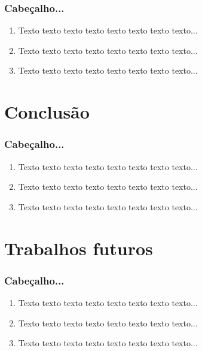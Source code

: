 \documentclass[table, usenames, svgnames, dvipsnames]{beamer}
\begin{document}
\begin{frame}
\frametitle{Cabeçalho...}
	\begin{enumerate}
    	\item Texto texto texto texto texto texto texto texto...
		\\[0.5em]

    	\item Texto texto texto texto texto texto texto texto...
		\\[0.5em]
    	
		\item Texto texto texto texto texto texto texto texto...
		\\[0.5em]
	\end{enumerate}
\end{frame}


\section{Conclusão}

\begin{frame}
\frametitle{Cabeçalho...}
	\begin{enumerate}
    	\item Texto texto texto texto texto texto texto texto...
		\\[0.5em]

    	\item Texto texto texto texto texto texto texto texto...
		\\[0.5em]
    	
		\item Texto texto texto texto texto texto texto texto...
		\\[0.5em]
	\end{enumerate}
\end{frame}

\section{Trabalhos futuros}

\begin{frame}
\frametitle{Cabeçalho...}
	\begin{enumerate}
    	\item Texto texto texto texto texto texto texto texto...
		\\[0.5em]

    	\item Texto texto texto texto texto texto texto texto...
		\\[0.5em]
    	
		\item Texto texto texto texto texto texto texto texto...
		\\[0.5em]
	\end{enumerate}
\end{frame}
\end{document}
